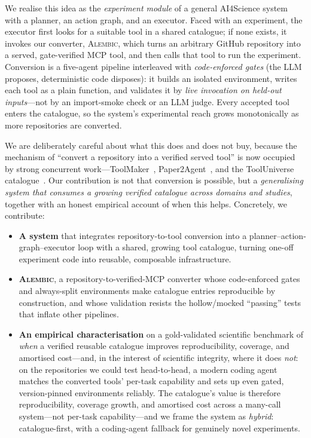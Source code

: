 We realise this idea as the \emph{experiment module} of a general AI4Science
system with a planner, an action graph, and an executor. Faced with an
experiment, the executor first looks for a suitable tool in a shared catalogue;
if none exists, it invokes our converter, \textsc{Alembic}, which turns an
arbitrary GitHub repository into a served, gate-verified MCP tool, and then calls
that tool to run the experiment. Conversion is a five-agent pipeline interleaved
with \emph{code-enforced gates} (the LLM proposes, deterministic code disposes):
it builds an isolated environment, writes each tool as a plain function, and
validates it by \emph{live invocation on held-out inputs}---not by an
import-smoke check or an LLM judge. Every accepted tool enters the catalogue, so
the system's experimental reach grows monotonically as more repositories are
converted.

We are deliberately careful about what this does and does not buy, because the
mechanism of ``convert a repository into a verified served tool'' is now
occupied by strong concurrent work---ToolMaker~\citep{wolflein2025toolmaker_acl},
Paper2Agent~\citep{miao2025paper2agent}, and the ToolUniverse
catalogue~\citep{gao2025tooluniverse}. Our contribution is not that conversion is
possible, but a \emph{generalising system that consumes a growing verified
catalogue across domains and studies}, together with an honest empirical account
of when this helps. Concretely, we contribute:
\begin{itemize}
  \item \textbf{A system} that integrates repository-to-tool conversion into a
    planner--action-graph--executor loop with a shared, growing tool catalogue,
    turning one-off experiment code into reusable, composable infrastructure.
  \item \textbf{\textsc{Alembic}}, a repository-to-verified-MCP converter whose
    code-enforced gates and always-split environments make catalogue entries
    reproducible by construction, and whose validation resists the
    hollow/mocked ``passing'' tests that inflate other pipelines.
  \item \textbf{An empirical characterisation} on a gold-validated scientific
    benchmark of \emph{when} a verified reusable catalogue improves
    reproducibility, coverage, and amortised cost---and, in the interest of
    scientific integrity, where it does \emph{not}: on the repositories we could
    test head-to-head, a modern coding agent matches the converted tools'
    per-task capability and sets up even gated, version-pinned environments
    reliably. The catalogue's value is therefore reproducibility, coverage
    growth, and amortised cost across a many-call system---not per-task
    capability---and we frame the system as \emph{hybrid}: catalogue-first, with
    a coding-agent fallback for genuinely novel experiments.
\end{itemize}
